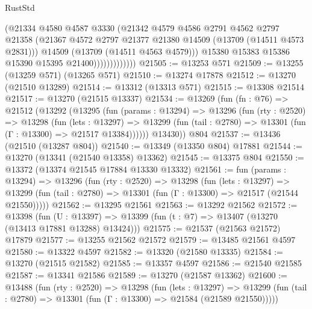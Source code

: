 \begin{lexlean}{RustStd}
\begin{coremodule}
                            (@21334
                              @4580
                              @4587
                              @3330
                              (@21342
                                @4579
                                @4586
                                @2791
                                @4562
                                @2797
                                @21358
                                (@21367
                                  @4572
                                  @2797
                                  @21377
                                  @21380
                                  @14509
                                  (@13709 (@14511 @4573 @2831)))
                                @14509
                                (@13709 (@14511 @4563 @4579)))
                              @15380
                              @15383
                              @15386
                              @15390
                              @15395
                              @21400)))))))))))))
@21505 := @13253 @571
@21509 := @13255 (@13259 @571) (@13265 @571)
@21510 := @13274 @17878
@21512 := @13270 (@21510 @13289)
@21514 := @13312 (@13313 @571)
@21515 := @13308 @21514
@21517 := @13270 (@21515 @13337)
@21534 := @13269
    (fun (fn : @76) =>
    @21512
      (@13292
        (@13295
          (fun (params : @13294) =>
          @13296
            (fun (rty : @2520) =>
            @13298
              (fun (lets : @13297) =>
              @13299 (fun (tail : @2780) => @13301 (fun (Γ : @13300) => @21517 @13384))))))
        @13430))
    @804
@21537 := @13436 (@21510 (@13287 @804))
@21540 := @13349 (@13350 @804) @17881
@21544 := @13270 (@13341 (@21540 @13358) @13362)
@21545 := @13375 @804
@21550 := @13372 (@13374 @21545 @17884 @13330 @13332)
@21561 := fun (params : @13294) =>
  @13296
    (fun (rty : @2520) =>
    @13298
      (fun (lets : @13297) =>
      @13299 (fun (tail : @2780) => @13301 (fun (Γ : @13300) => @21517 (@21544 @21550)))))
@21562 := @13295 @21561
@21563 := @13292 @21562
@21572 := @13398
    (fun (U : @13397) => @13399 (fun (t : @7) => @13407 (@13270 (@13413 @17881 @13288) @13424)))
@21575 := @21537 (@21563 @21572) @17879
@21577 := @13255 @21562 @21572
@21579 := @13485 @21561 @4597
@21580 := @13322 @4597
@21582 := @13320 (@21580 @13335)
@21584 := @13270 (@21515 @21582)
@21585 := @13357 @4597
@21586 := @21540 @21585
@21587 := @13341 @21586
@21589 := @13270 (@21587 @13362)
@21600 := @13488
    (fun (rty : @2520) =>
    @13298
      (fun (lets : @13297) =>
      @13299 (fun (tail : @2780) => @13301 (fun (Γ : @13300) => @21584 (@21589 @21550)))))

\end{coremodule}
\end{lexlean}
